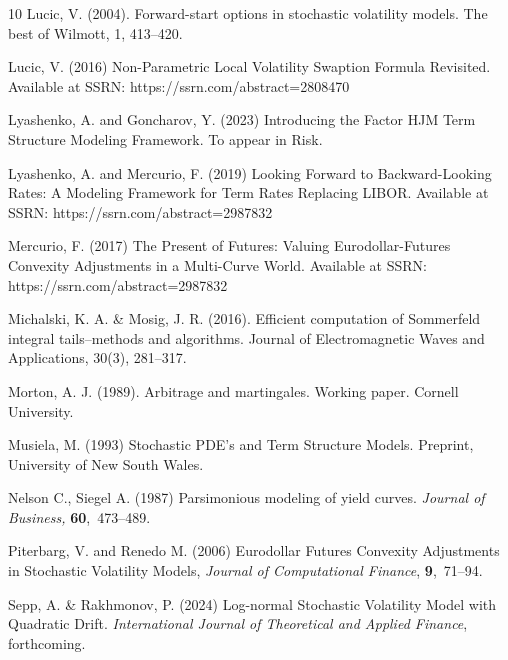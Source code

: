 \documentclass[pdftex,11pt,a4paper] {article}
\begin{document}
\begin{thebibliography}{10}
 Lucic, V. (2004). Forward-start options in stochastic volatility models. The best of Wilmott, 1, 413--420.

 Lucic, V. (2016) Non-Parametric Local Volatility Swaption Formula Revisited. Available at SSRN:  https://ssrn.com/abstract=2808470

 Lyashenko, A. and Goncharov, Y. (2023) Introducing the Factor HJM Term Structure Modeling Framework. To appear in Risk. 

 Lyashenko, A. and Mercurio, F. (2019) Looking Forward to Backward-Looking Rates: A Modeling Framework for Term Rates Replacing LIBOR. Available at SSRN: https://ssrn.com/abstract=2987832

 Mercurio, F. (2017) The Present of Futures: Valuing Eurodollar-Futures Convexity Adjustments in a Multi-Curve World. Available at SSRN:  https://ssrn.com/abstract=2987832

 Michalski, K. A. \& Mosig, J. R. (2016). Efficient computation of Sommerfeld integral tails–methods and algorithms. Journal of Electromagnetic Waves and Applications, 30(3), 281--317.

Morton, A. J. (1989). Arbitrage and martingales. Working paper. Cornell University.

Musiela, M. (1993) Stochastic PDE's and Term Structure Models. Preprint, University of New South Wales.

 Nelson C., Siegel A. (1987) Parsimonious modeling of yield curves. {\em Journal of Business,} {\bf 60},~473--489.


Piterbarg, V. and Renedo M. (2006) Eurodollar Futures Convexity Adjustments in Stochastic Volatility Models, {\em Journal of Computational Finance}, {\bf   9},~71--94.

 Sepp, A. \& Rakhmonov, P. (2024) Log-normal Stochastic Volatility Model with Quadratic Drift. {\em International Journal of Theoretical and Applied Finance}, forthcoming.


\end{thebibliography}
\end{document}
